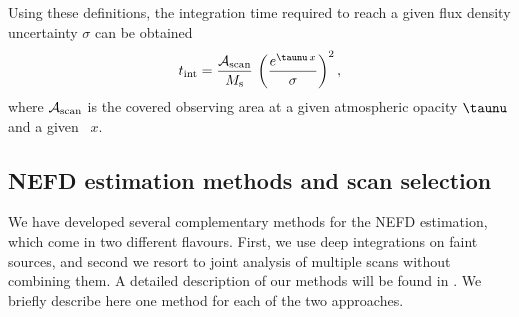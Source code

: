 
Using these definitions, the integration time required to reach a given
flux density uncertainty $\sigma$ can be obtained
\begin{equation}
  t_{\rm{int}} =  \frac{\mathcal{A}_{\rm{scan}}}{ M_{\rm{s}}} \, \left(\frac{e^{\taunu\, x}}{\sigma}\right)^2,
\end{equation}
where $\mathcal{A}_{\rm{scan}}$ is the covered observing area at a
given atmospheric opacity $\taunu$ and a given \airmass\ $x$.





\subsection{NEFD estimation methods and scan selection}
\label{se:nefd_method}

We have developed several complementary methods for the
NEFD estimation, which come in two different flavours. First, we
use deep integrations on faint sources, and second we resort to 
joint analysis of multiple scans without combining them. A detailed
description of our methods will be found in \citet{Ponthieu2019}.
We briefly describe here one method for each of the two approaches. \\

